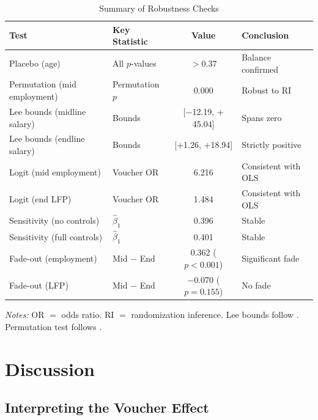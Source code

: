 \documentclass[12pt]{article}
\begin{document}
\begin{table}[htbp]
\centering
\caption{Summary of Robustness Checks}
\label{tab:robustness_summary}
\begin{threeparttable}
\begin{tabular}{@{}llcl@{}}
\toprule
Test & Key Statistic & Value & Conclusion \\
\midrule
Placebo (age) & All $p$-values & $> 0.37$ & Balance confirmed \\
Permutation (mid employment) & Permutation $p$ & 0.000 & Robust to RI \\
Lee bounds (midline salary) & Bounds & [$-$12.19, $+$45.04] & Spans zero \\
Lee bounds (endline salary) & Bounds & [$+$1.26, $+$18.94] & Strictly positive \\
Logit (mid employment) & Voucher OR & 6.216 & Consistent with OLS \\
Logit (end LFP) & Voucher OR & 1.484 & Consistent with OLS \\
Sensitivity (no controls) & $\hat{\beta}_1$ & 0.396 & Stable \\
Sensitivity (full controls) & $\hat{\beta}_1$ & 0.401 & Stable \\
Fade-out (employment) & Mid $-$ End & 0.362 ($p < 0.001$) & Significant fade \\
Fade-out (LFP) & Mid $-$ End & $-$0.070 ($p = 0.155$) & No fade \\
\bottomrule
\end{tabular}
\begin{tablenotes}[flushleft]
\small
\item \textit{Notes:} OR $=$ odds ratio. RI $=$ randomization inference. Lee bounds follow \citet{lee2009training}. Permutation test follows \citet{young2019channeling}.
\end{tablenotes}
\end{threeparttable}
\end{table}


\section{Discussion}\label{sec:discussion}

\subsection{Interpreting the Voucher Effect}
\end{document}
